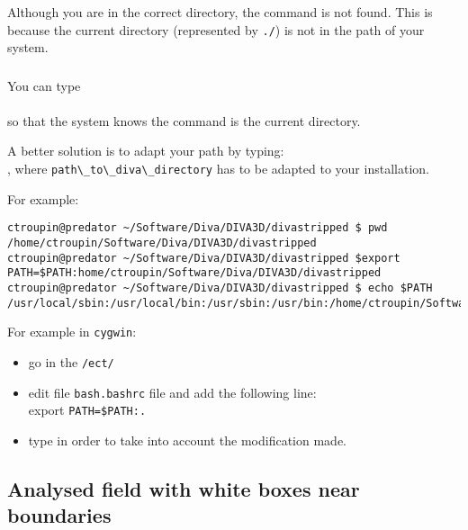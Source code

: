 \subsubsection{\question}

Although you are in the correct directory, the command is not found. This is because the current directory (represented by \texttt{./}) is not in the path of your system. 

\subsubsection{\answer}

You can type \\
\\
so that the system knows the command is the current directory.

A better solution is to adapt your path by typing:\\
, where \verb|path\_to\_diva\_directory| has to be adapted to your installation.

For example:
\begin{lstlisting}[style=Bash]
ctroupin@predator ~/Software/Diva/DIVA3D/divastripped $ pwd
/home/ctroupin/Software/Diva/DIVA3D/divastripped
ctroupin@predator ~/Software/Diva/DIVA3D/divastripped $export  PATH=$PATH:home/ctroupin/Software/Diva/DIVA3D/divastripped
ctroupin@predator ~/Software/Diva/DIVA3D/divastripped $ echo $PATH
/usr/local/sbin:/usr/local/bin:/usr/sbin:/usr/bin:/home/ctroupin/Software/Diva/DIVA3D/divastripped/
\end{lstlisting}

For example in \texttt{cygwin}:\\
\begin{itemize}
\item go in the \texttt{/ect/}
\item edit file \texttt{bash.bashrc} file
and add the following line:\\
export \texttt{PATH=\$PATH:.}
\item type  in order to take into account the modification made.
\end{itemize}



\subsection{Analysed field with white boxes near boundaries}

